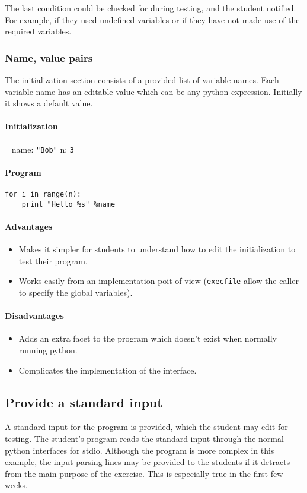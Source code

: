 The last condition could be checked for during testing, and the student notified. For example, if they used undefined variables or if they have not made use of the required variables.

\subsubsection{Name, value pairs}
The initialization section consists of a provided list of variable names. Each variable name has an editable value which can be any python expression. Initially it shows a default value.

\paragraph{Initialization} \texttt{ }
\newline
name: \texttt{"Bob"}
\newline
n: \texttt{3}
\paragraph{Program}
\begin{verbatim}
for i in range(n):
    print "Hello %s" %name
\end{verbatim}

\paragraph{Advantages}
\begin{itemize}
\item Makes it simpler for students to understand how to edit the initialization to test their program.
\item Works easily from an implementation poit of view (\texttt{execfile} allow the caller to specify the global variables).
\end{itemize}

\paragraph{Disadvantages}
\begin{itemize}
\item Adds an extra facet to the program which doesn't exist when normally running python.
\item Complicates the implementation of the interface.
\end{itemize}

\subsection{Provide a standard input}
A standard input for the program is provided, which the student may edit for testing. The student's program reads the standard input through the normal python interfaces for stdio. Although the program is more complex in this example, the input parsing lines may be provided to the students if it detracts from the main purpose of the exercise. This is especially true in the first few weeks. 

